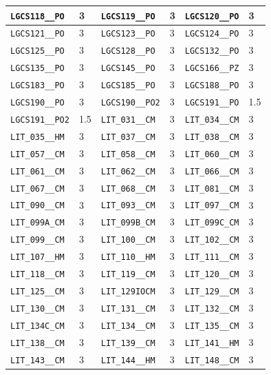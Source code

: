 \begin{longtable}{|l|l||l|l||l|l|}
    \verb|LGCS118__PO| & 3 & \verb|LGCS119__PO| & 3 & \verb|LGCS120__PO| & 3\\\hline
    \verb|LGCS121__PO| & 3 & \verb|LGCS123__PO| & 3 & \verb|LGCS124__PO| & 3\\\hline
    \verb|LGCS125__PO| & 3 & \verb|LGCS128__PO| & 3 & \verb|LGCS132__PO| & 3\\\hline
    \verb|LGCS135__PO| & 3 & \verb|LGCS145__PO| & 3 & \verb|LGCS166__PZ| & 3\\\hline
    \verb|LGCS183__PO| & 3 & \verb|LGCS185__PO| & 3 & \verb|LGCS188__PO| & 3\\\hline
    \verb|LGCS190__PO| & 3 & \verb|LGCS190__PO2| & 3 & \verb|LGCS191__PO| & 1.5\\\hline
    \verb|LGCS191__PO2| & 1.5 & \verb|LIT_031__CM| & 3 & \verb|LIT_034__CM| & 3\\\hline
    \verb|LIT_035__HM| & 3 & \verb|LIT_037__CM| & 3 & \verb|LIT_038__CM| & 3\\\hline
    \verb|LIT_057__CM| & 3 & \verb|LIT_058__CM| & 3 & \verb|LIT_060__CM| & 3\\\hline
    \verb|LIT_061__CM| & 3 & \verb|LIT_062__CM| & 3 & \verb|LIT_066__CM| & 3\\\hline
    \verb|LIT_067__CM| & 3 & \verb|LIT_068__CM| & 3 & \verb|LIT_081__CM| & 3\\\hline
    \verb|LIT_090__CM| & 3 & \verb|LIT_093__CM| & 3 & \verb|LIT_097__CM| & 3\\\hline
    \verb|LIT_099A_CM| & 3 & \verb|LIT_099B_CM| & 3 & \verb|LIT_099C_CM| & 3\\\hline
    \verb|LIT_099__CM| & 3 & \verb|LIT_100__CM| & 3 & \verb|LIT_102__CM| & 3\\\hline
    \verb|LIT_107__HM| & 3 & \verb|LIT_110__HM| & 3 & \verb|LIT_111__CM| & 3\\\hline
    \verb|LIT_118__CM| & 3 & \verb|LIT_119__CM| & 3 & \verb|LIT_120__CM| & 3\\\hline
    \verb|LIT_125__CM| & 3 & \verb|LIT_129IOCM| & 3 & \verb|LIT_129__CM| & 3\\\hline
    \verb|LIT_130__CM| & 3 & \verb|LIT_131__CM| & 3 & \verb|LIT_132__CM| & 3\\\hline
    \verb|LIT_134C_CM| & 3 & \verb|LIT_134__CM| & 3 & \verb|LIT_135__CM| & 3\\\hline
    \verb|LIT_138__CM| & 3 & \verb|LIT_139__CM| & 3 & \verb|LIT_141__HM| & 3\\\hline
    \verb|LIT_143__CM| & 3 & \verb|LIT_144__HM| & 3 & \verb|LIT_148__CM| & 3\\\hline

\end{longtable}
